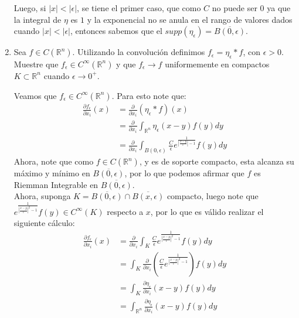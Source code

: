 \begin{homeworkProblem}
\begin{enumerate}
\begin{solucion}
        Luego, si $|x|<|\epsilon|$, se tiene el primer caso, que como $C$ no puede ser $0$ ya que la integral de $\eta$ es $1$ y la exponencial no se anula en el rango de valores dados cuando $|x|<|\epsilon|$, entonces sabemos que el $supp(\eta_{\epsilon})=\overline{B(0,\epsilon)}$. 
      \end{solucion}
      \newpage
    \item Sea $f\in C(\mathbb{R}^{n})$. Utilizando la convolución definimos $f_{\epsilon}=\eta_{\epsilon}*f$, con $\epsilon > 0$.\\
      Muestre que $f_{\epsilon}\in C^{\infty}(\mathbb{R}^{n})$ y que $f_{\epsilon}\rightarrow f$ uniformemente en compactos $K\subset \mathbb{R}^{n}$ cuando $\epsilon\rightarrow 0^+$.
      \begin{solucion}
        Veamos que $f_{\epsilon}\in C^{\infty}(\mathbb{R}^{n})$.
        Para esto note que:
        \begin{align*}
          \frac{\partial f_{\epsilon}}{\partial x_i}(x)&=\frac{\partial }{\partial x_i}(\eta_{\epsilon}*f)(x)\\
          &=\frac{\partial }{\partial x_i}\int_{\mathbb{R}^{n}}\eta_{\epsilon}(x-y)f(y)dy\\
          &=\frac{\partial }{\partial x_i}\int_{B(0,\epsilon)}\frac{C}{\epsilon}e^{\frac{1}{\left| \frac{x-y}{\epsilon} \right|-1}}f(y)dy
        \end{align*}
        Ahora, note que como $f\in C(\mathbb{R}^{n})$, y es de soporte compacto, esta alcanza su máximo y mínimo en $\overline{B(0,\epsilon)}$, por lo que podemos afirmar que $f$ es Riemman Integrable en $\overline{B(0,\epsilon)}$.\\
        Ahora, suponga $K=\overline{B(0,\epsilon)}\cap \overline{B(x,\epsilon)}$ compacto, luego note que $e^{\frac{1}{\left| \frac{x-y}{\epsilon} \right|^2-1}}f(y)\in C^{\infty}(K)$ respecto a $x$, por lo que es válido realizar el siguiente cálculo:
        \begin{align*}
          \frac{\partial f_{\epsilon}}{\partial x_i}(x)&=\frac{\partial }{\partial x_i}\int_{K}\frac{C}{\epsilon}e^{\frac{1}{\left| \frac{x-y}{\epsilon} \right|^2-1}}f(y)dy\\
          &=\int_{K}\frac{\partial }{\partial x_i}\left( \frac{C}{\epsilon} e^{\frac{1}{\left| \frac{x-y}{\epsilon} \right|^2-1}} \right)f(y)dy\\
          &=\int_{K}\frac{\partial \eta_{\epsilon}}{\partial x_i}(x-y)f(y)dy\\
          &=\int_{\mathbb{R}^{n}}\frac{\partial \eta_{\epsilon}}{\partial x_i}(x-y)f(y)dy\\

\end{align*}
\end{solucion}
\end{enumerate}
\end{homeworkProblem}
